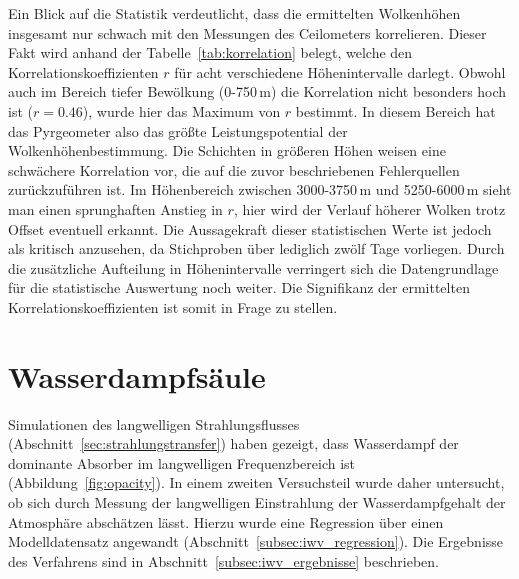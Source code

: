 \documentclass[10pt,a4paper,compsoc,peer review papers]{IEEEtran}
\begin{document}
Ein Blick auf die Statistik verdeutlicht, dass die ermittelten Wolkenhöhen
insgesamt nur schwach mit den Messungen des Ceilometers korrelieren. Dieser
Fakt wird anhand der Tabelle~\ref{tab:korrelation} belegt, welche den
Korrelationskoeffizienten $r$ für acht verschiedene Höhenintervalle darlegt.
Obwohl auch im Bereich tiefer Bewölkung  (0-750\,m) die Korrelation nicht
besonders hoch ist ($r = 0.46$), wurde hier das  Maximum von $r$ bestimmt. In
diesem Bereich hat das Pyrgeometer also das größte  Leistungspotential der
Wolkenhöhenbestimmung. Die Schichten in größeren Höhen  weisen eine schwächere
Korrelation vor, die auf die zuvor beschriebenen Fehlerquellen zurückzuführen
ist. Im Höhenbereich zwischen 3000-3750\,m und  5250-6000\,m sieht man einen
sprunghaften Anstieg in $r$, hier wird der Verlauf  höherer Wolken
trotz Offset eventuell erkannt. Die Aussagekraft dieser statistischen Werte
ist jedoch als kritisch anzusehen, da Stichproben über lediglich zwölf Tage
vorliegen. Durch die zusätzliche Aufteilung in Höhenintervalle verringert sich
die Datengrundlage für die statistische Auswertung noch weiter. Die Signifikanz
der ermittelten Korrelationskoeffizienten ist somit in Frage zu stellen.

\section{Wasserdampfsäule}\label{sec:wasserdampfsäule}
Simulationen des langwelligen Strahlungsflusses
(Abschnitt~\ref{sec:strahlungstransfer}) haben gezeigt, dass Wasserdampf der
dominante Absorber im langwelligen Frequenzbereich ist
(Abbildung~\ref{fig:opacity}).  In einem zweiten Versuchsteil wurde daher
untersucht, ob sich durch Messung der langwelligen Einstrahlung der
Wasserdampfgehalt der Atmosphäre abschätzen lässt.  Hierzu wurde eine
Regression über einen Modelldatensatz angewandt
(Abschnitt~\ref{subsec:iwv_regression}). Die Ergebnisse des Verfahrens sind in
Abschnitt~\ref{subsec:iwv_ergebnisse} beschrieben.
\end{document}

